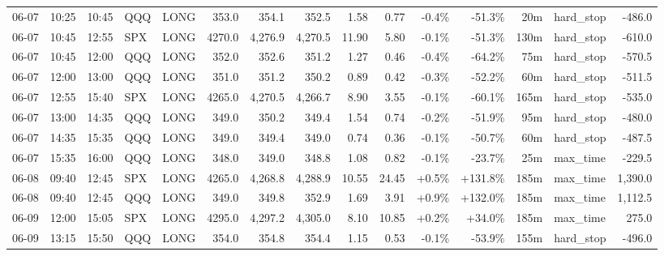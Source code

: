 \documentclass[11pt,a4paper,twoside]{article}
\begin{document}
\begin{landscape}
\begin{center}
\begin{longtable}{>{\color{txtmain}}l l l l l r r r r r r r r >{\color{txtmain}}l r}
06-07 & 10:25 & 10:45 & QQQ & LONG & 353.0 & 354.1 & 352.5 & 1.58 & 0.77 & \textcolor{lossred}{-0.4\%} & \textcolor{lossred}{-51.3\%} & 20m & hard\_stop & \textcolor{lossred}{-486.0} \\
06-07 & 10:45 & 12:55 & SPX & LONG & 4270.0 & 4,276.9 & 4,270.5 & 11.90 & 5.80 & \textcolor{lossred}{-0.1\%} & \textcolor{lossred}{-51.3\%} & 130m & hard\_stop & \textcolor{lossred}{-610.0} \\
06-07 & 10:45 & 12:00 & QQQ & LONG & 352.0 & 352.6 & 351.2 & 1.27 & 0.46 & \textcolor{lossred}{-0.4\%} & \textcolor{lossred}{-64.2\%} & 75m & hard\_stop & \textcolor{lossred}{-570.5} \\
06-07 & 12:00 & 13:00 & QQQ & LONG & 351.0 & 351.2 & 350.2 & 0.89 & 0.42 & \textcolor{lossred}{-0.3\%} & \textcolor{lossred}{-52.2\%} & 60m & hard\_stop & \textcolor{lossred}{-511.5} \\
06-07 & 12:55 & 15:40 & SPX & LONG & 4265.0 & 4,270.5 & 4,266.7 & 8.90 & 3.55 & \textcolor{lossred}{-0.1\%} & \textcolor{lossred}{-60.1\%} & 165m & hard\_stop & \textcolor{lossred}{-535.0} \\
06-07 & 13:00 & 14:35 & QQQ & LONG & 349.0 & 350.2 & 349.4 & 1.54 & 0.74 & \textcolor{lossred}{-0.2\%} & \textcolor{lossred}{-51.9\%} & 95m & hard\_stop & \textcolor{lossred}{-480.0} \\
06-07 & 14:35 & 15:35 & QQQ & LONG & 349.0 & 349.4 & 349.0 & 0.74 & 0.36 & \textcolor{lossred}{-0.1\%} & \textcolor{lossred}{-50.7\%} & 60m & hard\_stop & \textcolor{lossred}{-487.5} \\
06-07 & 15:35 & 16:00 & QQQ & LONG & 348.0 & 349.0 & 348.8 & 1.08 & 0.82 & \textcolor{lossred}{-0.1\%} & \textcolor{lossred}{-23.7\%} & 25m & max\_time & \textcolor{lossred}{-229.5} \\
06-08 & 09:40 & 12:45 & SPX & LONG & 4265.0 & 4,268.8 & 4,288.9 & 10.55 & 24.45 & \textcolor{wingreen}{+0.5\%} & \textcolor{wingreen}{+131.8\%} & 185m & max\_time & \textcolor{wingreen}{1,390.0} \\
06-08 & 09:40 & 12:45 & QQQ & LONG & 349.0 & 349.8 & 352.9 & 1.69 & 3.91 & \textcolor{wingreen}{+0.9\%} & \textcolor{wingreen}{+132.0\%} & 185m & max\_time & \textcolor{wingreen}{1,112.5} \\
06-09 & 12:00 & 15:05 & SPX & LONG & 4295.0 & 4,297.2 & 4,305.0 & 8.10 & 10.85 & \textcolor{wingreen}{+0.2\%} & \textcolor{wingreen}{+34.0\%} & 185m & max\_time & \textcolor{wingreen}{275.0} \\
06-09 & 13:15 & 15:50 & QQQ & LONG & 354.0 & 354.8 & 354.4 & 1.15 & 0.53 & \textcolor{lossred}{-0.1\%} & \textcolor{lossred}{-53.9\%} & 155m & hard\_stop & \textcolor{lossred}{-496.0} \\

\end{longtable}
\end{center}
\end{landscape}
\end{document}
